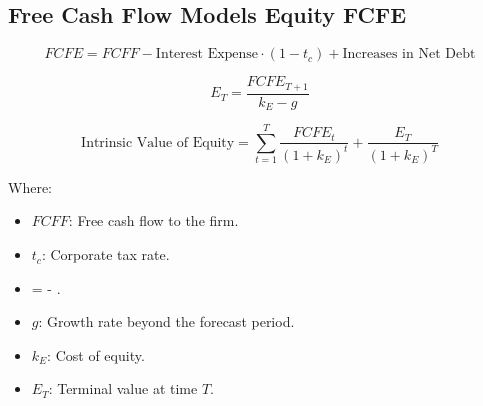 \documentclass[
]{book}
\providecommand{\tightlist}{%
  \setlength{\itemsep}{0pt}\setlength{\parskip}{0pt}}
\begin{document}
\hypertarget{free-cash-flow-models-equity-fcfe}{%
\subsection{Free Cash Flow Models Equity FCFE}\label{free-cash-flow-models-equity-fcfe}}

\[
FCFE = FCFF - \text{Interest Expense} \cdot (1 - t_c) + \text{Increases in Net Debt}
\]

\[
E_T = \frac{FCFE_{T+1}}{k_E - g}
\]

\[
\text{Intrinsic Value of Equity} = \sum_{t=1}^{T} \frac{FCFE_t}{(1 + k_E)^t} + \frac{E_T}{(1 + k_E)^T}
\]

Where:

\begin{itemize}
\tightlist
\item
  \(FCFF\): Free cash flow to the firm.
\item
  \(t_c\): Corporate tax rate.
\item
   =  - .
\item
  \(g\): Growth rate beyond the forecast period.
\item
  \(k_E\): Cost of equity.
\item
  \(E_T\): Terminal value at time \(T\).
\end{itemize}
\end{document}
